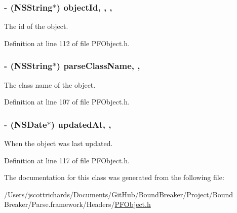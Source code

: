 \subsubsection[{object\+Id}]{\setlength{\rightskip}{0pt plus 5cm}-\/ (N\+S\+String$\ast$) object\+Id\hspace{0.3cm}{\ttfamily [read]}, {\ttfamily [write]}, {\ttfamily [nonatomic]}, {\ttfamily [strong]}}\label{interface_p_f_object_ac957b8fb3842dcf264264c3f4af836f6}
The id of the object. 

Definition at line 112 of file P\+F\+Object.\+h.

\hypertarget{interface_p_f_object_acd02c0585de1cc52e3adae4f3ea631aa}{}
\subsubsection[{parse\+Class\+Name}]{\setlength{\rightskip}{0pt plus 5cm}-\/ (N\+S\+String$\ast$) parse\+Class\+Name\hspace{0.3cm}{\ttfamily [read]}, {\ttfamily [atomic]}, {\ttfamily [strong]}}\label{interface_p_f_object_acd02c0585de1cc52e3adae4f3ea631aa}
The class name of the object. 

Definition at line 107 of file P\+F\+Object.\+h.

\hypertarget{interface_p_f_object_aa0bd6d2f6c6489b6cc06ef043c4b179a}{}
\subsubsection[{updated\+At}]{\setlength{\rightskip}{0pt plus 5cm}-\/ (N\+S\+Date$\ast$) updated\+At\hspace{0.3cm}{\ttfamily [read]}, {\ttfamily [nonatomic]}, {\ttfamily [strong]}}\label{interface_p_f_object_aa0bd6d2f6c6489b6cc06ef043c4b179a}
When the object was last updated. 

Definition at line 117 of file P\+F\+Object.\+h.



The documentation for this class was generated from the following file\+:\begin{DoxyCompactItemize}
\item 
/\+Users/jscottrichards/\+Documents/\+Git\+Hub/\+Bound\+Breaker/\+Project/\+Bound Breaker/\+Parse.\+framework/\+Headers/\hyperlink{_p_f_object_8h}{P\+F\+Object.\+h}\end{DoxyCompactItemize}

